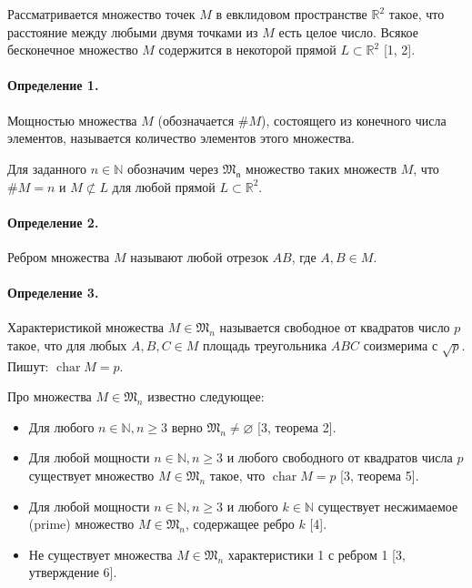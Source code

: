 

\vzmscaption

Рассматривается множество точек $M$ в евклидовом пространстве $\mathbb{R}^{2}$ такое, что расстояние между любыми двумя точками из $M$ есть целое число. Всякое бесконечное множество $M$ содержится в некоторой прямой $L \subset \mathbb{R}^2$ [1, 2].

\paragraph{Определение 1.}
Мощностью множества $M$ (обозначается $\#M$), состоящего из конечного
числа элементов, называется количество элементов этого множества.

Для заданного $n \in \mathbb{N}$ обозначим через $\mathfrak{M_n}$ множество таких множеств $M$, что  $\#M=n$ и $M \not \subset L$ для любой прямой $L \subset \mathbb{R}^{2}$.

\paragraph{Определение 2.}
Ребром множества $M$ называют любой отрезок $AB$, где $A, B \in M$.

\paragraph{Определение 3.}
Характеристикой множества $M \in \mathfrak{M}_{n}$ называется свободное от квадратов число $p$ такое,
что для любых $A, B, C \in M$ площадь треугольника $ABC$ соизмерима с $\sqrt{p}$.
Пишут: $\operatorname{char}{M}={p}$.


Про множества $M \in \mathfrak{M}_{n}$ известно следующее:
\begin{itemize}
	\item
		Для любого $n \in \mathbb{N}, n \geq 3$ верно $\mathfrak{M}_{n} \neq \varnothing$ [3, теорема 2].

	\item
		Для любой мощности $n \in \mathbb{N}, n \geq 3$ и любого свободного от квадратов числа $p$ существует множество $M \in \mathfrak{M}_{n}$ такое, что $\operatorname{char}{M}={p}$ [3, теорема 5].
	\item
		Для любой мощности $n \in \mathbb{N}, n \geq 3$ и любого $k \in \mathbb{N}$ существует несжимаемое \foreignlanguage{english}{(prime)} множество $M \in \mathfrak{M}_{n}$, содержащее ребро ${k}$ [4].
	\item
		Не существует множества $M \in \mathfrak{M}_{n}$ характеристики 1 с ребром 1 [3, утверждение 6].
\end{itemize}

